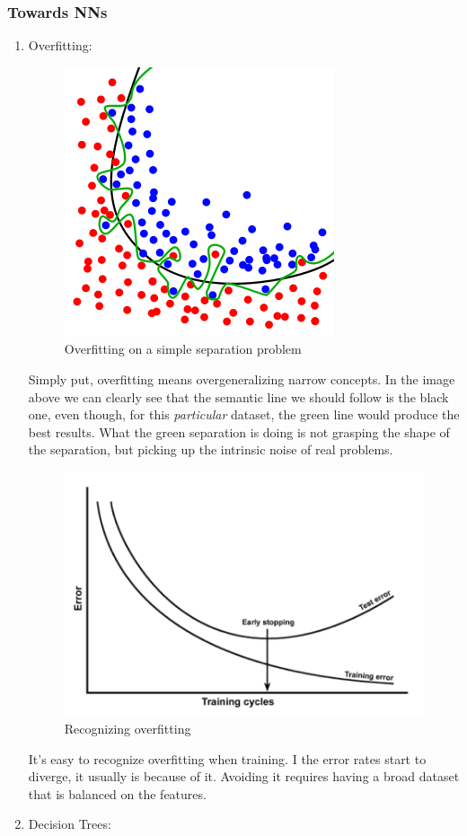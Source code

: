 \subsubsection{Towards NNs}\label{s:fund-intro-tonn}
\begin{enumerate}
	\item Overfitting:
		\begin{figure}[H]
			\centering
			\includegraphics[scale=0.4]{images/overfitting.png}
			\caption{Overfitting on a simple separation problem}
			\label{f:overfitting}
		\end{figure}
		Simply put, overfitting means overgeneralizing narrow concepts. In the image above we can clearly see that the semantic line we should follow is the black one, even though, for this \emph{particular} dataset, the green line would produce the best results.
		What the green separation is doing is not grasping the shape of the separation, but picking up the intrinsic noise of real problems.
		
		\begin{figure}[H]
			\centering
			\includegraphics[scale=1.2]{images/overfittinglines.png}
			\caption{Recognizing overfitting}
			\label{f:overfittinglines}
		\end{figure}
		It's easy to recognize overfitting when training. I the error rates start to diverge, it usually is because of it. Avoiding it requires having a broad dataset that is balanced on the features.
	\item Decision Trees:
		

\end{enumerate}
